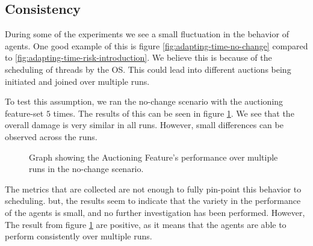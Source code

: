 
\subsection{Consistency}
\label{ssec:consecutive-runs}
During some of the experiments we see a small fluctuation in the behavior of agents. One good example of this is figure \ref{fig:adapting-time-no-change} compared to \ref{fig:adapting-time-risk-introduction}. We believe this is because of the scheduling of threads by the OS. This could lead into different auctions being initiated and joined over multiple runs. 

To test this assumption, we ran the no-change scenario with the auctioning feature-set $5$ times. The results of this can be seen in figure \ref{fig:multi-run-no-change}. We see that the overall damage is very similar in all runs. However, small differences can be observed across the runs.

\begin{figure}[H]
    \centering
        
    \caption{Graph showing the Auctioning Feature's performance over multiple runs in the no-change scenario.}
    \label{fig:multi-run-no-change}
\end{figure}

The metrics that are collected are not enough to fully pin-point this behavior to scheduling. but, the results seem to indicate that the variety in the performance of the agents is small, and no further investigation has been performed. However, The result from figure \ref{fig:multi-run-no-change} are positive, as it means that the agents are able to perform consistently over multiple runs.

